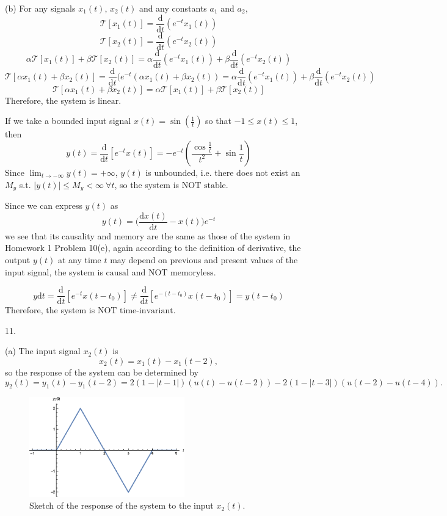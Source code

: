 \documentclass[a4paper]{article}
\begin{document}
(b) For any signals $x_1(t)$, $x_2(t)$ and any constants $a_1$ and $a_2$,
$$\mathcal{T}[x_1(t)]=\frac{\mathrm{d}}{\mathrm{d}t}(e^{-t}x_1(t))$$
$$\mathcal{T}[x_2(t)]=\frac{\mathrm{d}}{\mathrm{d}t}(e^{-t}x_2(t))$$
$$\alpha\mathcal{T}[x_1(t)]+\beta\mathcal{T}[x_2(t)]=\alpha\frac{\mathrm{d}}{\mathrm{d}t}(e^{-t}x_1(t))+\beta\frac{\mathrm{d}}{\mathrm{d}t}(e^{-t}x_2(t))$$
$$\mathcal{T}[\alpha x_1(t)+\beta x_2(t)]=\frac{\mathrm{d}}{\mathrm{d}t}(e^{-t}(\alpha x_1(t)+\beta x_2(t))=\alpha\frac{\mathrm{d}}{\mathrm{d}t}(e^{-t}x_1(t))+\beta\frac{\mathrm{d}}{\mathrm{d}t}(e^{-t}x_2(t))$$
$$\mathcal{T}[\alpha x_1(t)+\beta x_2(t)]=\alpha\mathcal{T}[x_1(t)]+\beta\mathcal{T}[x_2(t)]$$
Therefore, the system is $\boxed{\text{linear}}$.

If we take a bounded input signal $x(t)=\sin(\frac{1}{t})$ so that $-1\leq x(t)\leq1$, then
$$y(t)=\frac{\mathrm{d}}{\mathrm{d}t}[e^{-t}x(t)]=-e^{-t}(\frac{\cos\frac{1}{t}}{t^2}+\sin\frac{1}{t})$$
Since $\lim_{t\rightarrow-\infty}y(t)=+\infty$, $y(t)$ is unbounded, i.e. there does not exist an $M_y$ s.t. $|y(t)|\leq M_y<\infty\ \forall t$, so the system is $\boxed{\text{NOT stable}}$.

Since we can express $y(t)$ as
$$y(t)=\bigg(\frac{\mathrm{d}x(t)}{\mathrm{d}t}-x(t)\bigg)e^{-t}$$
we see that its causality and memory are the same as those of the system in Homework 1 Problem 10(e), again according to the definition of derivative, the output $y(t)$ at any time $t$ may depend on previous and present values of the input signal, the system is $\boxed{\text{causal}}$ and $\boxed{\text{NOT memoryless}}$.

$$y\mathrm{d}t=\frac{\mathrm{d}}{\mathrm{d}t}[{e^{-t}}x(t-t_0)]\neq\frac{\mathrm{d}}{\mathrm{d}t}[e^{-(t-t_0)}x(t-t_0)]=y(t-t_0)$$
Therefore, the system is $\boxed{\text{NOT time-invariant}}$.

11.

(a) The input signal $x_2(t)$ is
$$x_2(t)=x_1(t)-x_1(t-2),$$
so the response of the system can be determined by
$$y_2(t)=y_1(t)-y_1(t-2)=2(1-|t-1|)(u(t)-u(t-2))-2(1-|t-3|)(u(t-2)-u(t-4)).$$
\begin{figure}[H]
    \begin{center}
        \includegraphics[width=0.6\textwidth]{11(a).eps}
    \end{center}
    \caption{Sketch of the response of the system to the input $x_2(t)$.}
\end{figure}
\end{document}

